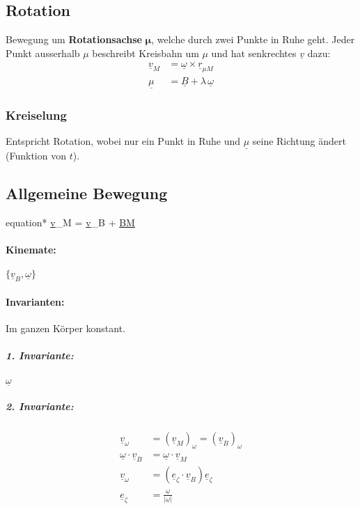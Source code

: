 \documentclass{article}
\begin{document}
\begin{multicols*}{4}
			\subsection{Rotation} %
				Bewegung um \textbf{Rotationsachse} $\mathbf{\mu}$, welche durch zwei Punkte in Ruhe geht. Jeder Punkt ausserhalb $\mu$ beschreibt Kreisbahn um $\mu$ und hat senkrechtes $\underline{v}$ dazu:
				\begin{align*}
					\underline{v}_M &= \underline{\omega} \times \underline{r}_{\mu M} \\
					\underline{\mu} &= \underline{B} + \lambda \, \underline{\omega}
				\end{align*}
				\subsubsection{Kreiselung} %
					Entspricht Rotation, wobei nur ein Punkt in Ruhe und $\underline{\mu}$ seine Richtung ändert (Funktion von $t$).
			\subsection{Allgemeine Bewegung} %
				\begin{empheq}[box=\shadowbox*]{equation*}
					\underline{v}_M = \underline{v}_B + \underline{\omega} \times \underline{BM}
				\end{empheq}
				\paragraph{Kinemate:} %
					$\{\underline{v}_B,\underline{\omega}\}$
				\paragraph{Invarianten:} %
					Im ganzen Körper konstant.
					\subparagraph{1. Invariante:} %
						$\underline{\omega}$
					\subparagraph{2. Invariante:} %
						\begin{align*}
							\underline{v}_{\omega} &= \left(\underline{v}_M\right)_{\omega} = \left(\underline{v}_B\right)_{\omega} \\
							\underline{\omega} \cdot \underline{v}_B &= \underline{\omega} \cdot \underline{v}_M \\
							\underline{v}_{\omega} &= \left(\underline{e}_{\zeta} \cdot \underline{v}_B\right) \underline{e}_{\zeta} \\
							\underline{e}_{\zeta} &= \frac{\underline{\omega}}{|\underline{\omega}|}
						\end{align*}

\end{multicols*}
\end{document}
